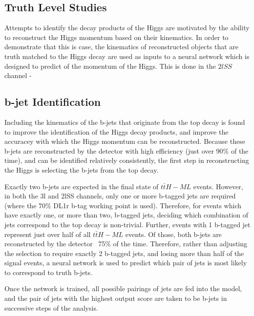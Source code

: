 \subsection{Truth Level Studies}
\label{sec:truthPtStudies}

Attempts to identify the decay products of the Higgs are motivated by the ability to reconstruct the Higgs momentum based on their kinematics. In order to demonstrate that this is case, the kinematics of reconstructed objects that are truth matched to the Higgs decay are used as inputs to a neural network which is designed to predict of the momentum of the Higgs. This is done in the $2lSS$ channel - 

\subsection{b-jet Identification}
\label{sec:bjetID}

Including the kinematics of the b-jets that originate from the top decay is found to improve the identification of the Higgs decay products, and improve the accuracey with which the Higgs momentum can be reconstructed. Because these b-jets are reconstructed by the detector with high efficiency (just over 90\% of the time), and can be identified relatively consistently, the first step in reconstructing the Higgs is selecting the b-jets from the top decay.

Exactly two b-jets are expected in the final state of $t\bar{t}H-ML$ events. However, in both the 3l and 2lSS channels, only one or more b-tagged jets are required (where the 70\% DL1r b-tag working point is used). Therefore, for events which have exactly one, or more than two, b-tagged jets, deciding which combination of jets correspond to the top decay is non-trivial. Further, events with 1 b-tagged jet represent just over half of all $t\bar{t}H-ML$ events. Of those, both b-jets are reconstructed by the detector ~75\% of the time. Therefore, rather than adjusting the selection to require exactly 2 b-tagged jets, and losing more than half of the signal events, a neural network is used to predict which pair of jets is most likely to correspond to truth b-jets.

Once the network is trained, all possible pairings of jets are fed into the model, and the pair of jets with the highest output score are taken to be b-jets in successive steps of the analysis. 

